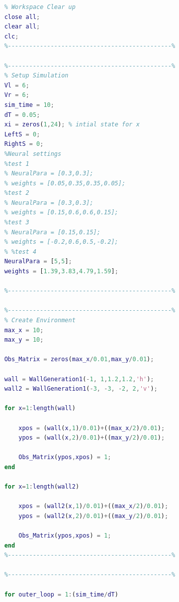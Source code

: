 \documentclass{l4proj}
\begin{document}
\begin{lstlisting}[language=Matlab, float, caption={Code implementing Neural controller
}, label=lst:callahan]
    %----------------------------------------------%
    % Workspace Clear up
    close all;
    clear all;
    clc;
    %----------------------------------------------%
    
    %----------------------------------------------%
    % Setup Simulation
    Vl = 6;
    Vr = 6;
    sim_time = 10;
    dT = 0.05;
    xi = zeros(1,24); % intial state for x
    LeftS = 0;
    RightS = 0;
    %Neural settings
    %test 1
    % NeuralPara = [0.3,0.3];
    % weights = [0.05,0.35,0.35,0.05];
    %test 2
    % NeuralPara = [0.3,0.3];
    % weights = [0.15,0.6,0.6,0.15];
    %test 3
    % NeuralPara = [0.15,0.15];
    % weights = [-0.2,0.6,0.5,-0.2];
    % %test 4
    NeuralPara = [5,5];
    weights = [1.39,3.83,4.79,1.59];
    
    %----------------------------------------------%
    
    %----------------------------------------------%
    % Create Environment
    max_x = 10;
    max_y = 10;
    
    Obs_Matrix = zeros(max_x/0.01,max_y/0.01);
    
    wall = WallGeneration1(-1, 1,1.2,1.2,'h');
    wall2 = WallGeneration1(-3, -3, -2, 2,'v');
    
    for x=1:length(wall)
        
        xpos = (wall(x,1)/0.01)+((max_x/2)/0.01);
        ypos = (wall(x,2)/0.01)+((max_y/2)/0.01);
        
        Obs_Matrix(ypos,xpos) = 1;
    end
    
    for x=1:length(wall2)
        
        xpos = (wall2(x,1)/0.01)+((max_x/2)/0.01);
        ypos = (wall2(x,2)/0.01)+((max_y/2)/0.01);
        
        Obs_Matrix(ypos,xpos) = 1;
    end
    %----------------------------------------------%
    
    %----------------------------------------------%
    
    for outer_loop = 1:(sim_time/dT)
\end{lstlisting}
\end{document}
